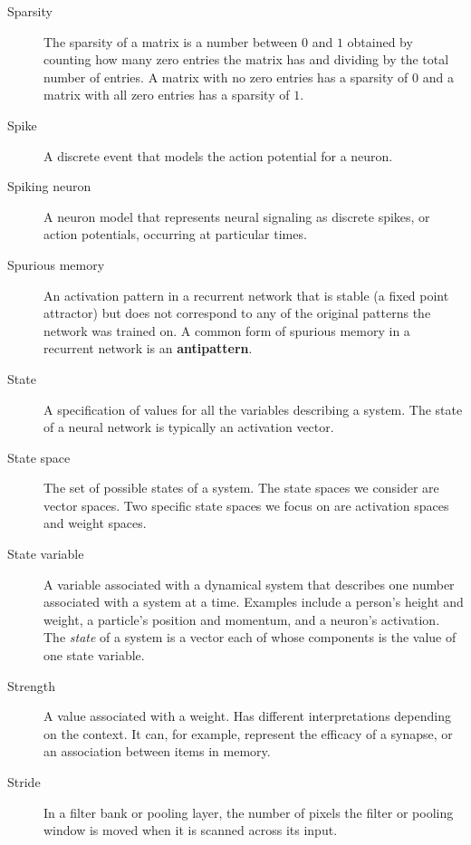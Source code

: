 \begin{description}
\item[Sparsity] The sparsity of a matrix is a number between $0$ and $1$ obtained by counting how many zero entries the matrix has and dividing by the total number of entries. A matrix with no zero entries has a sparsity of $0$ and a matrix with all zero entries has a sparsity of $1$.

\item[Spike] A discrete event that models the action potential for a neuron.

\item[Spiking neuron] A neuron model that represents neural signaling as discrete spikes, or action potentials, occurring at particular times.

\item[Spurious memory] An activation pattern in a recurrent network that is stable (a fixed point attractor) but does not correspond to any of the original patterns the network was trained on. A common form of spurious memory in a recurrent network is an \textbf{antipattern}.

\item[State] A specification of values for all the variables describing a system. The state of a neural network is typically an activation vector.

\item[State space] The set of possible states of a system. The state spaces we consider are vector spaces. Two specific state spaces we focus on are activation spaces and weight spaces.

\item[State variable] A variable associated with a dynamical system that describes one number associated with a system at a time. Examples include a person's height and weight, a particle's position and momentum, and a neuron's activation. The \emph{state} of a system is a vector each of whose components is the value of one state variable. 


\item[Strength] A value associated with a weight. Has different interpretations depending on the context. It can, for example, represent the efficacy of a synapse, or an association between items in memory.

\item[Stride] In a filter bank or pooling layer, the number of pixels the filter or pooling window is moved when it is scanned across its input.


\end{description}
